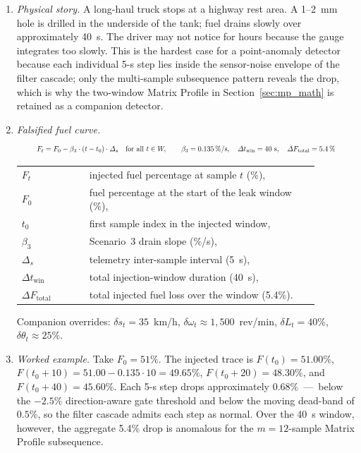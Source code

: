 \begin{enumerate}[label=\textbf{(\alph*)}, leftmargin=*]
    \item \textit{Physical story.} A long-haul truck stops at a highway rest area. A 1--2~mm hole is drilled in the underside of the tank; fuel drains slowly over approximately 40~s. The driver may not notice for hours because the gauge integrates too slowly. This is the hardest case for a point-anomaly detector because each individual 5-s step lies inside the sensor-noise envelope of the filter cascade; only the multi-sample subsequence pattern reveals the drop, which is why the two-window Matrix Profile in Section~\ref{sec:mp_math} is retained as a companion detector.

    \item \textit{Falsified fuel curve.}
    \begin{equation}
    \resizebox{0.88\linewidth}{!}{$\displaystyle
    F_t = F_0 - \beta_3 \cdot (t - t_0) \cdot \Delta_s \quad \text{for all } t \in W, \qquad \beta_3 = 0.135\,\%/\text{s}, \quad \Delta t_{\mathrm{win}} = 40\text{ s}, \quad \Delta F_{\mathrm{total}} = 5.4\,\%
    $}
    \label{eq:injection_s3}
    \end{equation}
    \noindent\begin{tabular}{@{}p{0.20\linewidth}@{\quad}p{0.68\linewidth}@{}}
    $F_t$ & injected fuel percentage at sample $t$ (\%), \\
    $F_0$ & fuel percentage at the start of the leak window (\%), \\
    $t_0$ & first sample index in the injected window, \\
    $\beta_3$ & Scenario~3 drain slope (\%/s), \\
    $\Delta_s$ & telemetry inter-sample interval (5~s), \\
    $\Delta t_{\mathrm{win}}$ & total injection-window duration (40~s), \\
    $\Delta F_{\mathrm{total}}$ & total injected fuel loss over the window (5.4\%).
    \end{tabular}

    \vspace{0.5em}
    Companion overrides: $\delta s_t = 35$~km/h, $\delta \omega_t \approx 1{,}500$~rev/min, $\delta L_t = 40\%$, $\delta \theta_t \approx 25\%$.

    \item \textit{Worked example.} Take $F_0 = 51\%$. The injected trace is $F(t_0) = 51.00\%$, $F(t_0 + 10) = 51.00 - 0.135 \cdot 10 = 49.65\%$, $F(t_0 + 20) = 48.30\%$, and $F(t_0 + 40) = 45.60\%$. Each 5-s step drops approximately $0.68\%$~---~below the $-2.5\%$ direction-aware gate threshold and below the moving dead-band of $0.5\%$, so the filter cascade admits each step as normal. Over the 40~s window, however, the aggregate 5.4\% drop is anomalous for the $m = 12$-sample Matrix Profile subsequence.


\end{enumerate}

